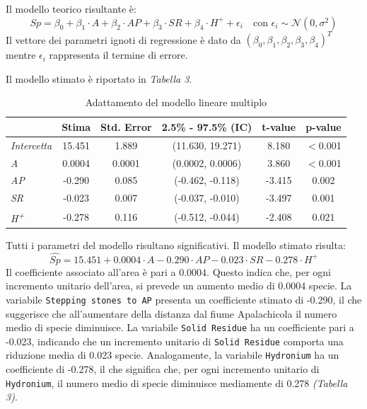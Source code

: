 \documentclass{article} %
\begin{document}
Il modello teorico risultante è:
\[
Sp =\beta_0+\beta_1 \cdot A+\beta_2\cdot AP +\beta_3\cdot SR+\beta_4\cdot H^+ +\epsilon_i \quad \text{con } \epsilon_i \sim \mathcal{N}(0,\sigma^2)
\]
Il vettore dei parametri ignoti di regressione è dato da $(\beta_0,\beta_1,\beta_2,\beta_3,\beta_4)^T$ mentre $\epsilon_i$ rappresenta il termine di errore. 

Il modello stimato è riportato in \textit{Tabella 3}.

\begin{table}[H]
    \centering
    \renewcommand{\arraystretch}{1.4} %
    \begin{tabular}{lccccc}
        \toprule
        &  Stima &  Std. Error &  2.5\% - 97.5\% (IC) & t-value &  p-value \\
        \midrule  
        \textit{Intercetta} & 15.451   & 1.889  & (11.630, 19.271) & 8.180  & $<$0.001 \\
        \textit{A} & 0.0004   & 0.0001 & (0.0002, 0.0006) & 3.860    & $<$0.001  \\
        \textit{AP} & -0.290   & 0.085  & (-0.462, -0.118)  & -3.415 & 0.002 \\
        \textit{SR} & -0.023   & 0.007  & (-0.037, -0.010) & -3.497 & 0.001  \\
        \textit{H\textsuperscript{+}} & -0.278   & 0.116  & (-0.512, -0.044) & -2.408 & 0.021 \\
        \bottomrule
    \end{tabular}
    \caption{Adattamento del modello lineare multiplo}
\end{table}
Tutti i parametri del modello risultano significativi. 
Il modello stimato risulta:
\[
\hat{Sp}=15.451+0.0004 \cdot A-0.290\cdot AP -0.023\cdot SR-0.278\cdot H^+
\]
Il coefficiente associato  all'area è pari a 0.0004. Questo indica che, per ogni incremento unitario dell'area, si prevede un aumento medio di 0.0004 specie. 
La variabile \texttt{Stepping stones to AP} presenta un coefficiente stimato di -0.290, il che suggerisce che all'aumentare della distanza dal fiume Apalachicola il numero medio di specie diminuisce.
La variabile \texttt{Solid Residue} ha un coefficiente pari a -0.023, indicando che un incremento unitario di \texttt{Solid Residue} comporta una riduzione media di 0.023 specie. Analogamente, la variabile \texttt{Hydronium} ha un coefficiente di -0.278, il che significa che, per ogni incremento unitario di \texttt{Hydronium}, il numero medio di specie diminuisce mediamente di 0.278 \textit{(Tabella 3)}.
\end{document}
